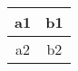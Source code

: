 \documentclass{article}
\begin{document}
\begin{tabular}{|c|c|}
\hline
a1 & b1 \\
\hline
a2 & b2 \\
\hline
\end{tabular}
\end{document}
